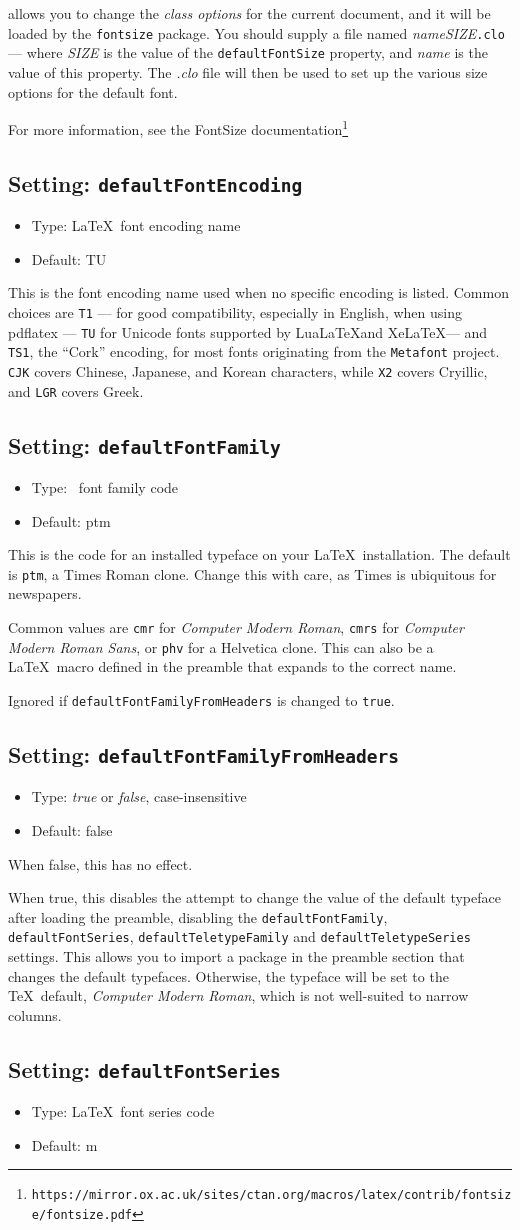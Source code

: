 \documentclass[a4paper,DIV=11]{scrartcl}
\newcommand{\property}[5]{
  \subsection{#1: \texttt{#2}}
  \begin{itemize}
  \item Type: #3
  \item Default: #4
  \end{itemize}
  #5
}
\newcommand{\setting}{\property{Setting}}
\begin{document}
\begin{multicols}{2}
{  allows you to change the \textit{class options} for the current
  document, and it will be loaded by the \texttt{fontsize}
  package. You should supply a file named
  \textit{nameSIZE}\texttt{.clo} --- where \textit{SIZE} is the value
  of the \texttt{defaultFontSize} property, and \textit{name} is the
  value of this property. The \textit{.clo} file will then be used to
  set up the various size options for the default font.\par
  For more information, see the FontSize documentation\footnote{\texttt{https://mirror.ox.ac.uk/sites/ctan.org/macros/latex/contrib/fontsize/fontsize.pdf}}
}
\setting{defaultFontEncoding}{\LaTeX\ font encoding name}{TU}{This is
  the font encoding name used when no specific encoding is
  listed. Common choices are \texttt{T1} --- for good compatibility,
  especially in English, when using pdflatex --- \texttt{TU} for
  Unicode fonts supported by Lua\LaTeX and Xe\LaTeX ---
  and \texttt{TS1}, the ``Cork'' encoding, for most fonts originating from the
  \texttt{Metafont} project. \texttt{CJK} covers Chinese, Japanese, and Korean
  characters, while \texttt{X2} covers Cryillic, and \texttt{LGR}
  covers Greek.
}
\setting{defaultFontFamily}{\LaTeXe\ font family code}{ptm}{This is the code
  for an installed typeface on your \LaTeX\ installation. The default is
  \texttt{ptm}, a Times Roman clone. Change this with care, as
  Times is ubiquitous for newspapers.\par Common values are
  \texttt{cmr} for \textit{Computer Modern Roman}, \texttt{cmrs} for
  \textit{Computer Modern Roman Sans}, or \texttt{phv} for a Helvetica
  clone. This can also be a \LaTeX\ macro defined in the preamble that
  expands to the correct name.
  \par Ignored if \texttt{defaultFontFamilyFromHeaders} is changed to
  \texttt{true}.
}
\setting{defaultFontFamilyFromHeaders}{\textit{true} or \textit{false}, case-insensitive}{false}{
  When false, this has no effect.\par
  When true, this disables the attempt to change the value of the default
  typeface after loading the preamble, disabling the
  \texttt{defaultFontFamily}, \texttt{defaultFontSeries},
  \texttt{defaultTeletypeFamily} and \texttt{defaultTeletypeSeries}
  settings. This allows you to import a
  package in the preamble section that changes the default
  typefaces. Otherwise, the typeface will be set to the \TeX\ default,
  \textit{Computer Modern Roman}, which is not well-suited to narrow
  columns.
}
\setting{defaultFontSeries}{\LaTeX\ font series code}{m}{
}
\end{multicols}
\end{document}
